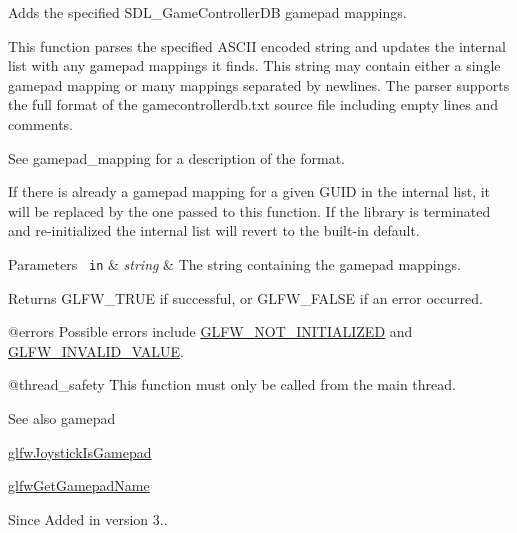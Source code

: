 Adds the specified S\+D\+L\+\_\+\+Game\+Controller\+DB gamepad mappings. 

This function parses the specified A\+S\+C\+II encoded string and updates the internal list with any gamepad mappings it finds. This string may contain either a single gamepad mapping or many mappings separated by newlines. The parser supports the full format of the {\ttfamily gamecontrollerdb.\+txt} source file including empty lines and comments.

See gamepad\+\_\+mapping for a description of the format.

If there is already a gamepad mapping for a given G\+U\+ID in the internal list, it will be replaced by the one passed to this function. If the library is terminated and re-\/initialized the internal list will revert to the built-\/in default.


\begin{DoxyParams}[1]{Parameters}
\mbox{\texttt{ in}}  & {\em string} & The string containing the gamepad mappings. \\
\hline
\end{DoxyParams}
\begin{DoxyReturn}{Returns}
{\ttfamily G\+L\+F\+W\+\_\+\+T\+R\+UE} if successful, or {\ttfamily G\+L\+F\+W\+\_\+\+F\+A\+L\+SE} if an error occurred.
\end{DoxyReturn}
@errors Possible errors include \mbox{\hyperlink{group__errors_ga2374ee02c177f12e1fa76ff3ed15e14a}{G\+L\+F\+W\+\_\+\+N\+O\+T\+\_\+\+I\+N\+I\+T\+I\+A\+L\+I\+Z\+ED}} and \mbox{\hyperlink{group__errors_gaaf2ef9aa8202c2b82ac2d921e554c687}{G\+L\+F\+W\+\_\+\+I\+N\+V\+A\+L\+I\+D\+\_\+\+V\+A\+L\+UE}}.

@thread\+\_\+safety This function must only be called from the main thread.

\begin{DoxySeeAlso}{See also}
gamepad 

\mbox{\hyperlink{group__input_gac9720b6e5062a5fc5fc0bb4be6dc04a0}{glfw\+Joystick\+Is\+Gamepad}} 

\mbox{\hyperlink{group__input_ga3eeee2a61f1763b599ab8eb3a4f02d52}{glfw\+Get\+Gamepad\+Name}}
\end{DoxySeeAlso}
\begin{DoxySince}{Since}
Added in version 3.. 
\end{DoxySince}
